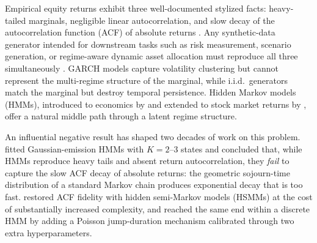 Empirical equity returns exhibit three well-documented stylized facts: heavy-tailed marginals, negligible linear autocorrelation, and slow decay of the autocorrelation function (ACF) of absolute returns \cite{mandelbrot1963variation, cont2001empirical}.
Any synthetic-data generator intended for downstream tasks such as risk measurement, scenario generation, or regime-aware dynamic asset allocation \cite{baekimmulvey2014} must reproduce all three simultaneously \cite{assefa2020generating, jordon2022synthetic}.
GARCH models \cite{engle1982autoregressive, bollerslev1986generalized} capture volatility clustering but cannot represent the multi-regime structure of the marginal, while i.i.d.\ generators match the marginal but destroy temporal persistence.
Hidden Markov models (HMMs), introduced to economics by \citet{hamilton1989new} and extended to stock market returns by \citet{schaller1997regime}, offer a natural middle path through a latent regime structure.

An influential negative result has shaped two decades of work on this problem.
\citet{ryden1998stylized} fitted Gaussian-emission HMMs with $K = 2$--$3$ states and concluded that, while HMMs reproduce heavy tails and absent return autocorrelation, they \emph{fail} to capture the slow ACF decay of absolute returns: the geometric sojourn-time distribution of a standard Markov chain produces exponential decay that is too fast.
\citet{bulla2006stylized} restored ACF fidelity with hidden semi-Markov models (HSMMs) at the cost of substantially increased complexity, and \citet{alswaidan2026hybrid} reached the same end within a discrete HMM by adding a Poisson jump-duration mechanism calibrated through two extra hyperparameters.

